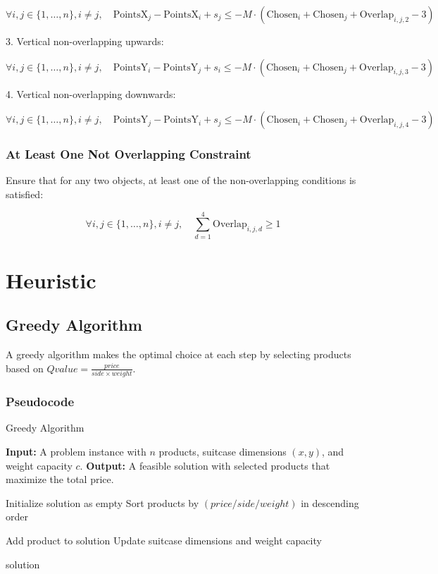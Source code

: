 \documentclass{article}
\begin{document}
\[
\forall i, j \in \{1, \ldots, n\}, i \neq j, \quad \text{PointsX}_j - \text{PointsX}_i + s_j \leq -M \cdot (\text{Chosen}_i + \text{Chosen}_j + \text{Overlap}_{i,j,2} - 3)
\]

3. Vertical non-overlapping upwards:

\[
\forall i, j \in \{1, \ldots, n\}, i \neq j, \quad \text{PointsY}_i - \text{PointsY}_j + s_i \leq -M \cdot (\text{Chosen}_i + \text{Chosen}_j + \text{Overlap}_{i,j,3} - 3)
\]

4. Vertical non-overlapping downwards:

\[
\forall i, j \in \{1, \ldots, n\}, i \neq j, \quad \text{PointsY}_j - \text{PointsY}_i + s_j \leq -M \cdot (\text{Chosen}_i + \text{Chosen}_j + \text{Overlap}_{i,j,4} - 3)
\]

\subsubsection{At Least One Not Overlapping Constraint}

Ensure that for any two objects, at least one of the non-overlapping conditions is satisfied:

\[
\forall i, j \in \{1, \ldots, n\}, i \neq j, \quad \sum_{d=1}^4 \text{Overlap}_{i,j,d} \geq 1
\]

\section{Heuristic}

\subsection{Greedy Algorithm}
A greedy algorithm makes the optimal choice at each step by selecting products based on $Qvalue = \frac{price}{side \times weight}$.

\subsubsection{Pseudocode}
\begin{algorithm}
\caption{Greedy Algorithm}
\begin{algorithmic}
    \State \textbf{Input:} A problem instance with $n$ products, suitcase dimensions $(x, y)$, and weight capacity $c$.
    \State \textbf{Output:} A feasible solution with selected products that maximize the total price.    

    \State Initialize solution as empty
    \State Sort products by $(price / side / weight)$ in descending order

            \State Add product to solution
            \State Update suitcase dimensions and weight capacity
        \EndIf
    \EndFor

    \State \Return solution
\end{algorithmic}
\end{algorithm}
\end{document}
